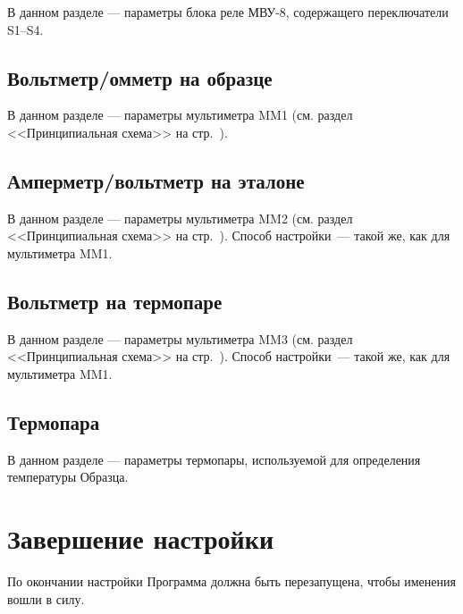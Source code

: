 \documentclass[12pt, a4paper, twocolumn]{report}
\begin{document}
В данном разделе --- параметры блока реле МВУ-8, содержащего переключатели S1--S4.



\subsection{Вольтметр/омметр на образце}

В данном разделе --- параметры мультиметра MM1 (см. раздел <<Принципиальная схема>> на стр.~\pageref{sec_schematic_diagram}).



\subsection{Амперметр/вольтметр на эталоне}

В данном разделе --- параметры мультиметра MM2 (см. раздел <<Принципиальная схема>> на стр.~\pageref{sec_schematic_diagram}). Способ настройки~--- такой же, как для мультиметра MM1.


\subsection{Вольтметр на термопаре}

В данном разделе --- параметры мультиметра MM3 (см. раздел <<Принципиальная схема>> на стр.~\pageref{sec_schematic_diagram}). Способ настройки~--- такой же, как для мультиметра MM1.

\subsection{Термопара}

В данном разделе --- параметры термопары, используемой для определения температуры Образца.



\section{Завершение настройки}

По окончании настройки Программа должна быть перезапущена, чтобы именения вошли в силу.
\end{document}
